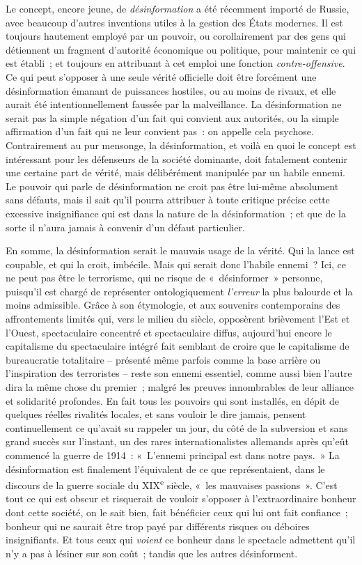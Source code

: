 \documentclass[french,twoside]{book} %
\begin{document}
\noindent Le concept, encore jeune, de \emph{désinformation} a été récemment importé de Russie, avec beaucoup d’autres inventions utiles à la gestion des États modernes. Il est toujours hautement employé par un pouvoir, ou corollairement par des gens qui détiennent un fragment d’autorité économique ou politique, pour maintenir ce qui est établi ; et toujours en attribuant à cet emploi une fonction \emph{contre-offensive}. Ce qui peut s’opposer à une seule vérité officielle doit être forcément une désinformation émanant de puissances hostiles, ou au moins de rivaux, et elle aurait été intentionnellement faussée par la malveillance. La désinformation ne serait pas la simple négation d’un fait qui convient aux autorités, ou la simple affirmation d’un fait qui ne leur convient pas : on appelle cela psychose. Contrairement au pur mensonge, la désinformation, et voilà en quoi le concept est intéressant pour les défenseurs de la société dominante, doit fatalement contenir une certaine part de vérité, mais délibérément manipulée par un habile ennemi. Le pouvoir qui parle de désinformation ne croit pas être lui-même absolument sans défauts, mais il sait qu’il pourra attribuer à toute critique précise cette excessive insignifiance qui est dans la nature de la désinformation ; et que de la sorte il n’aura jamais à convenir d’un défaut particulier.\par
En somme, la désinformation serait le mauvais usage de la vérité. Qui la lance est coupable, et qui la croit, imbécile. Mais qui serait donc l’habile ennemi ? Ici, ce ne peut pas être le terrorisme, qui ne risque de « désinformer » personne, puisqu’il est chargé de représenter ontologiquement \emph{l’erreur} la plus balourde et la moins admissible. Grâce à son étymologie, et aux souvenirs contemporains des affrontements limités qui, vers le milieu du siècle, opposèrent brièvement l’Est et l’Ouest, spectaculaire concentré et spectaculaire diffus, aujourd’hui encore le capitalisme du spectaculaire intégré fait semblant de croire que le capitalisme de bureaucratie totalitaire – présenté même parfois comme la base arrière ou l’inspiration des terroristes – reste son ennemi essentiel, comme aussi bien l’autre dira la même chose du premier ; malgré les preuves innombrables de leur alliance et solidarité profondes. En fait tous les pouvoirs qui sont installés, en dépit de quelques réelles rivalités locales, et sans vouloir le dire jamais, pensent continuellement ce qu’avait su rappeler un jour, du côté de la subversion et sans grand succès sur l’instant, un des rares internationalistes allemands après qu’eût commencé la guerre de 1914 : « L’ennemi principal est dans notre pays. » La désinformation est finalement l’équivalent de ce que représentaient, dans le discours de la guerre sociale du \textsc{XIX}\textsuperscript{e} siècle, « les mauvaises passions ». C’est tout ce qui est obscur et risquerait de vouloir s’opposer à l’extraordinaire bonheur dont cette société, on le sait bien, fait bénéficier ceux qui lui ont fait confiance ; bonheur qui ne saurait être trop payé par différents risques ou déboires insignifiants. Et tous ceux qui \emph{voient} ce bonheur dans le spectacle admettent qu’il n’y a pas à lésiner sur son coût ; tandis que les autres désinforment.\par
\end{document}
